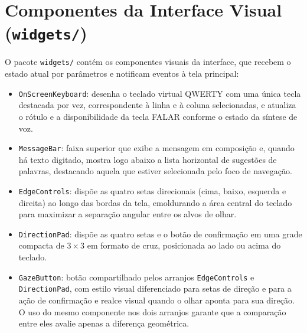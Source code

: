  \section{Componentes da Interface Visual (\texttt{widgets/})}

O pacote \texttt{widgets/} contém os componentes visuais da interface, que recebem o estado atual por parâmetros e notificam eventos à tela principal:

\begin{itemize}
    \item \texttt{OnScreenKeyboard}: desenha o teclado virtual QWERTY com uma única tecla destacada por vez, correspondente à linha e à coluna selecionadas, e atualiza o rótulo e a disponibilidade da tecla FALAR conforme o estado da síntese de voz.
    \item \texttt{MessageBar}: faixa superior que exibe a mensagem em composição e, quando há texto digitado, mostra logo abaixo a lista horizontal de sugestões de palavras, destacando aquela que estiver selecionada pelo foco de navegação.
    \item \texttt{EdgeControls}: dispõe as quatro setas direcionais (cima, baixo, esquerda e direita) ao longo das bordas da tela, emoldurando a área central do teclado para maximizar a separação angular entre os alvos de olhar.
    \item \texttt{DirectionPad}: dispõe as quatro setas e o botão de confirmação em uma grade compacta de $3 \times 3$ em formato de cruz, posicionada ao lado ou acima do teclado.
    \item \texttt{GazeButton}: botão compartilhado pelos arranjos \texttt{EdgeControls} e \texttt{DirectionPad}, com estilo visual diferenciado para setas de direção e para a ação de confirmação e realce visual quando o olhar aponta para sua direção. O uso do mesmo componente nos dois arranjos garante que a comparação entre eles avalie apenas a diferença geométrica.

\end{itemize}
